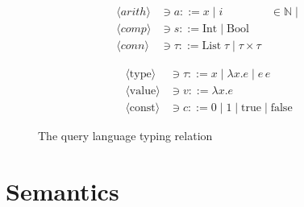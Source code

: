 \begin{figure}
    \centering
    \begin{minipage}[t]{0.45\textwidth}
        \centering
        \begin{align*}
            \langle arith \rangle &\ni a ::= x \;|\; i &\in \mathbb{N}  \;|\; \\
            \langle comp \rangle &\ni s ::= \text{Int} \;|\; \text{Bool} \\
            \langle conn \rangle &\ni \tau ::= \text{List}\;\tau \;|\; \tau \times \tau
        \end{align*}
    \end{minipage}
    \hfill
    \begin{minipage}[t]{0.45\textwidth}
        \centering
        \begin{align*}
            \langle \text{type} \rangle &\ni \tau ::= x \;|\; \lambda x.e \;|\; e\,e \\
            \langle \text{value} \rangle &\ni v ::= \lambda x.e \\
            \langle \text{const} \rangle &\ni c ::= 0 \;|\; 1 \;|\; \text{true} \;|\; \text{false}
        \end{align*}
    \end{minipage}
    \caption{The \vnnlib{} query language typing relation}
    \label{fig:vnnlib_typing_rules}
\end{figure}

\section{Semantics}
\label{sec:semantics}


